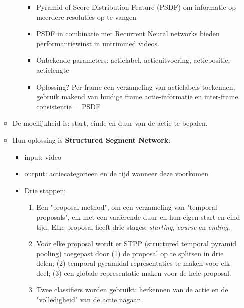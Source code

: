 \begin{itemize}
\begin{itemize}
\begin{itemize}
\begin{itemize}
				\item Pyramid of Score Distribution Feature (PSDF) om informatie op meerdere resoluties op te vangen
				\item PSDF in combinatie met Recurrent Neural networks bieden performantiewinst in untrimmed videos.
				\item Onbekende parameters: actielabel, actieuitvoering, actiepositie, actielengte
				\item Oplossing? Per frame een verzameling van actielabels toekennen, gebruik makend van huidige frame actie-informatie en inter-frame consistentie = PSDF
	
			\end{itemize}
		
		\end{itemize}
		\item De moeilijkheid is: start, einde en duur van de actie te bepalen.
		\item Hun oplossing is \textbf{Structured Segment Network}:
		\begin{itemize}
			\item input: video
			\item output: actiecategorieën en de tijd wanneer deze voorkomen
			\item Drie stappen:
			\begin{enumerate}
				\item Een "proposal method",  om een verzameling van "temporal proposals", elk met een variërende duur en hun eigen start en eind tijd.  Elke proposal heeft drie stages: \textit{starting, course} en \textit{ending}. 
				\item Voor elke proposal wordt er STPP (structured temporal pyramid pooling) toegepast door (1) de proposal op te splitsen in drie delen; (2) temporal pyramidal representaties te maken voor elk deel; (3) een globale representatie maken voor de hele proposal.
				\item Twee classifiers worden gebruikt: herkennen van de actie en de "volledigheid" van de actie nagaan.
			\end{enumerate}
		\end{itemize}
	\end{itemize}



\end{itemize}
